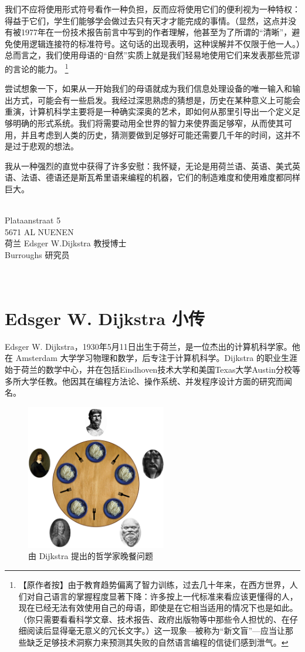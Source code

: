 \documentclass[a4paper,12pt]{article}
\begin{document}
我们不应将使用形式符号看作一种负担，反而应将使用它们的便利视为一种特权：得益于它们，学生们能够学会做过去只有天才才能完成的事情。（显然，这点并没有被1977年在一份技术报告前言中写到的作者理解，他甚至为了所谓的“清晰”，避免使用逻辑连接符的标准符号。这句话的出现表明，这种误解并不仅限于他一人。）总而言之，我们使用母语的“自然”实质上就是我们轻易地使用它们来发表那些荒谬的言论的能力。
\footnote{【原作者按】由于教育趋势偏离了智力训练，过去几十年来，在西方世界，人们对自己语言的掌握程度显著下降：许多按上一代标准来看应该更懂得的人，现在已经无法有效使用自己的母语，即使是在它相当适用的情况下也是如此。（你只需要看看科学文章、技术报告、政府出版物等中那些令人担忧的、在仔细阅读后显得毫无意义的冗长文字。）这一现象—被称为“新文盲”—应当让那些缺乏足够技术洞察力来预测其失败的自然语言编程的信徒们感到泄气。}

尝试想象一下，如果从一开始我们的母语就成为我们信息处理设备的唯一输入和输出方式，可能会有一些启发。我经过深思熟虑的猜想是，历史在某种意义上可能会重演，计算机科学主要将是一种确实深奥的艺术，即如何从那里引导出一个定义足够明确的形式系统。我们将需要动用全世界的智力来使界面足够窄，从而使其可用，并且考虑到人类的历史，猜测要做到足够好可能还需要几千年的时间，这并不是过于悲观的想法。

我从一种强烈的直觉中获得了许多安慰：我怀疑，无论是用荷兰语、英语、美式英语、法语、德语还是斯瓦希里语来编程的机器，它们的制造难度和使用难度都同样巨大。

　\\Plataanstraat 5\\
5671 AL NUENEN\\
荷兰 Edsger W.Dijkstra 教授博士\\
Burroughs 研究员\\

\appendix
　\\　\\
\section{Edsger W. Dijkstra 小传}

Edsger W. Dijkstra，1930年5月11日出生于荷兰，是一位杰出的计算机科学家。他在 Amsterdam 大学学习物理和数学，后专注于计算机科学。Dijkstra 的职业生涯始于荷兰的数学中心，并在包括Eindhoven技术大学和美国Texas大学Austin分校等多所大学任教。他因其在编程方法论、操作系统、并发程序设计方面的研究而闻名。

\begin{figure}[ht]
\centering
\includegraphics[height=2.5in]{images/dining_philosophers.png}
\caption{由 Dijkstra 提出的哲学家晚餐问题}
\end{figure}
\end{document}
